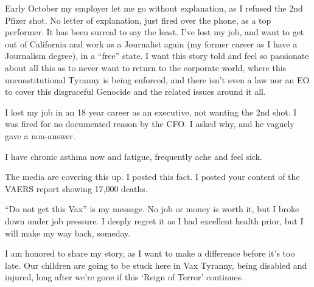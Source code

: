{Early October my employer let me go without explanation, as I refused the 2nd
Pfizer shot. No letter of explanation, just fired over the phone, as a top
performer. It has been surreal to say the least. I’ve lost my job, and want to
get out of California and work as a Journalist again (my former career as I have
a Journalism degree), in a “free” state. I want this story told and feel so
passionate about all this as to never want to return to the corporate world,
where this unconstitutional Tyranny is being enforced, and there isn’t even a
law nor an EO to cover this disgraceful Genocide and the related issues around
it all.

I lost my job in an 18 year career as an executive, not wanting the 2nd shot. I
was fired for no documented reason by the CFO. I asked why, and he vaguely gave
a non-answer.

I have chronic asthma now and fatigue, frequently ache and feel sick.

The media are covering this up. I posted this fact. I posted your content of the
VAERS report showing 17,000 deaths.

“Do not get this Vax” is my message. No job or money is worth it, but I broke
down under job pressure. I deeply regret it as I had excellent health prior, but
I will make my way back, someday.

I am honored to share my story, as I want to make a difference before it’s too
late. Our children are going to be stuck here in Vax Tyranny, being disabled and
injured, long after we’re gone if this ‘Reign of Terror’ continues.

}

